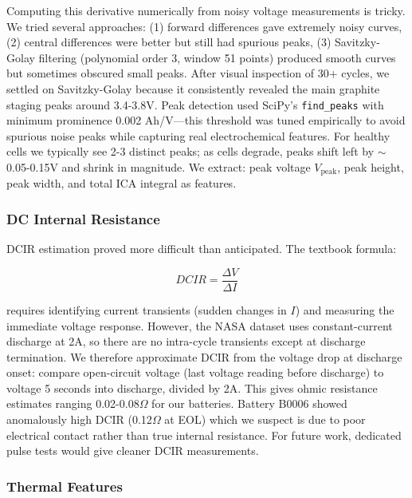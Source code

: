 \documentclass{sn-jnl}
\begin{document}
Computing this derivative numerically from noisy voltage measurements is tricky. We tried several approaches: (1) forward differences gave extremely noisy curves, (2) central differences were better but still had spurious peaks, (3) Savitzky-Golay filtering (polynomial order 3, window 51 points) produced smooth curves but sometimes obscured small peaks. After visual inspection of 30+ cycles, we settled on Savitzky-Golay because it consistently revealed the main graphite staging peaks around 3.4-3.8V. Peak detection used SciPy's \texttt{find\_peaks} with minimum prominence 0.002 Ah/V—this threshold was tuned empirically to avoid spurious noise peaks while capturing real electrochemical features. For healthy cells we typically see 2-3 distinct peaks; as cells degrade, peaks shift left by $\sim$0.05-0.15V and shrink in magnitude. We extract: peak voltage $V_{\text{peak}}$, peak height, peak width, and total ICA integral as features.

\subsubsection{DC Internal Resistance}
\label{subsubsec:dcir}

DCIR estimation proved more difficult than anticipated. The textbook formula:

\begin{equation}
\label{eq:dcir}
    DCIR = \frac{\Delta V}{\Delta I}
\end{equation}

requires identifying current transients (sudden changes in $I$) and measuring the immediate voltage response. However, the NASA dataset uses constant-current discharge at 2A, so there are no intra-cycle transients except at discharge termination. We therefore approximate DCIR from the voltage drop at discharge onset: compare open-circuit voltage (last voltage reading before discharge) to voltage 5 seconds into discharge, divided by 2A. This gives ohmic resistance estimates ranging 0.02-0.08$\Omega$ for our batteries. Battery B0006 showed anomalously high DCIR (0.12$\Omega$ at EOL) which we suspect is due to poor electrical contact rather than true internal resistance. For future work, dedicated pulse tests would give cleaner DCIR measurements.

\subsubsection{Thermal Features}
\label{subsubsec:thermal}
\end{document}

